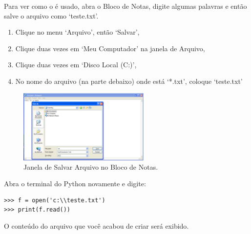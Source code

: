 \begin{WINDOWS}

Para ver como o  é usado, abra o Bloco de Notas, digite algumas palavras e então salve o arquivo como `teste.txt'.

\begin{enumerate}
 \item Clique no menu `Arquivo', então `Salvar',
 \item Clique duas vezes em `Meu Computador' na janela de Arquivo,
 \item Clique duas vezes em `Disco Local (C:)',
 \item No nome do arquivo (na parte debaixo) onde está `*.txt', coloque `teste.txt' 
\end{enumerate}

\begin{figure}
\begin{center}
\includegraphics[width=65mm]{eps/figure17.eps}
\end{center}
\caption{Janela de Salvar Arquivo no Bloco de Notas.}\label{fig17}
\end{figure}

Abra o terminal do Python novamente e digite:

\begin{listing}
\begin{verbatim}
>>> f = open('c:\\teste.txt')
>>> print(f.read())
\end{verbatim}
\end{listing}

O conteúdo do arquivo que você acabou de criar será exibido.
\end{WINDOWS}

